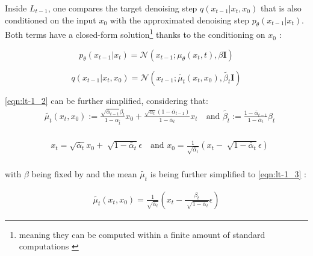 Inside $L_{t-1}$, one compares the target denoising step $q(x_{t-1}|x_t,x_0)$ that is also conditioned on the input $x_0$ with the approximated denoising step $p_\theta(x_{t-1}|x_t)$. %
Both terms have a closed-form solution\footnote{meaning they can be computed within a finite amount of standard computations \cite{borwein2013ClosedFormsWhat}} thanks to the conditioning on $x_0$ \cite{ho2020DenoisingDiffusionProbabilistic}:

\begin{equation}
  \label{eqn:lt-1_1}
  p_\theta(x_{t-1}|x_t)= \mathcal{N}(x_{t-1};\mu_\theta(x_t,t), \beta\textbf{I})
\end{equation}

\begin{equation}
  \label{eqn:lt-1_2}
q(x_{t-1}|x_t,x_0) = \mathcal{N}(x_{t-1};\tilde{\mu_t}(x_t,x_0), \tilde{\beta_t}\textbf{I})
\end{equation}

\autoref{eqn:lt-1_2} can be further simplified, considering that:
\begin{equation}
  \begin{align}
    &\tilde{\mu_t}(x_t, x_0) := \frac{\sqrt{\bar{\alpha}_{t-1}}\beta_t}{1 - \alpha_{\bar{t}}}x_0 +   \frac{\sqrt{\alpha_t}(1-\bar{\alpha}_{t-1})}{1 - \bar{\alpha}_{t}}x_t \quad \textrm{and }
    \tilde{\beta_t}:=\frac{1-\bar{\alpha}_{t-1}}{1-\bar{\alpha}_t}\beta_t \nonumber\\
  \end{align}
\end{equation}
    
\begin{equation}
  \begin{align}
    &x_t = \sqrt{\bar{\alpha}_{t}}x_0+\sqrt[]{1-\bar{\alpha}_t}\epsilon \quad\textrm{and }
    x_0 = \frac{1}{\sqrt{\bar{\alpha}_t}}(x_t-\sqrt[]{1-\bar{\alpha}_t}\epsilon) \nonumber\\
  \end{align}
\end{equation}

with $\beta$ being fixed by \cite{ho2020DenoisingDiffusionProbabilistic} and the mean $\tilde{\mu_t}$ is being further simplified to \autoref{eqn:lt-1_3} \cite{ho2020DenoisingDiffusionProbabilistic}:

\begin{equation}
  \begin{align}
    \label{eqn:lt-1_3}
    \tilde{\mu_t}(x_t, x_0) = \frac{1}{\sqrt{\bar{\alpha}_t}}(x_t - \frac{\beta_t}{\sqrt[]{1-\bar{\alpha}_t}}\epsilon)
  \end{align}
\end{equation}

